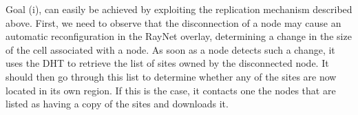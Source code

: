 \documentclass{article}
\begin{document}
Goal (i), can easily be achieved by exploiting the replication
mechanism described above. First, we need to observe that the
disconnection of a node may cause an automatic reconfiguration in the
RayNet overlay, determining a change in the size of the cell
associated with a node.  As soon as a node detects such a change, it
uses the DHT to retrieve the list of sites owned by the disconnected
node. It should then go through this list to determine whether any of
the sites are now located in its own region. If this is the case, it
contacts one the nodes that are listed as having a copy of the sites
and downloads it.
\end{document}
